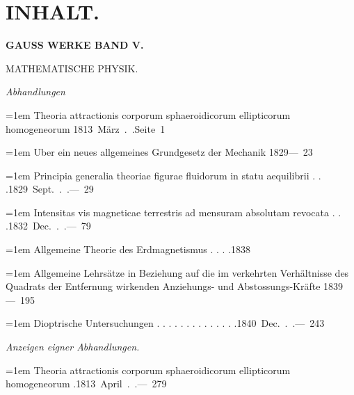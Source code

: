 \section*{INHALT.}
\begin{center}\bfseries GAUSS WERKE BAND V.\par MATHEMATISCHE PHYSIK.\end{center}
\begingroup\fontsize{9}{11}\selectfont\raggedright
\par{}\medskip\noindent\textit{Abhandlungen}\par\smallskip
\noindent\hangindent=1em Theoria attractionis corporum sphaeroidicorum ellipticorum homogeneorum \unskip\hspace{1em plus 1fill}\mbox{1813 März . .\quad Seite 1}\par\smallskip
\noindent\hangindent=1em Uber ein neues allgemeines Grundgesetz der Mechanik \unskip\hspace{1em plus 1fill}\mbox{1829\quad — 23}\par\smallskip
\noindent\hangindent=1em Principia generalia theoriae figurae fluidorum in statu aequilibrii . . .\unskip\hspace{1em plus 1fill}\mbox{1829 Sept. . .\quad — 29}\par\smallskip
\noindent\hangindent=1em Intensitas vis magneticae terrestris ad mensuram absolutam revocata . . .\unskip\hspace{1em plus 1fill}\mbox{1832 Dec. . .\quad — 79}\par\smallskip
\noindent\hangindent=1em Allgemeine Theorie des Erdmagnetismus . . . .\unskip\hspace{1em plus 1fill}\mbox{1838}\par\smallskip
\noindent\hangindent=1em Allgemeine Lehrsätze in Beziehung auf die im verkehrten Verhältnisse des Quadrats der Entfernung wirkenden Anziehungs- und Abstossungs-Kräfte \unskip\hspace{1em plus 1fill}\mbox{1839\quad — 195}\par\smallskip
\noindent\hangindent=1em Dioptrische Untersuchungen . . . . . . . . . . . . . .\unskip\hspace{1em plus 1fill}\mbox{1840 Dec. . .\quad — 243}\par\smallskip
\par{}\medskip\noindent\textit{Anzeigen eigner Abhandlungen.}\par\smallskip
\noindent\hangindent=1em Theoria attractionis corporum sphaeroidicorum ellipticorum homogeneorum .\unskip\hspace{1em plus 1fill}\mbox{1813 April . .\quad — 279}\par\smallskip

